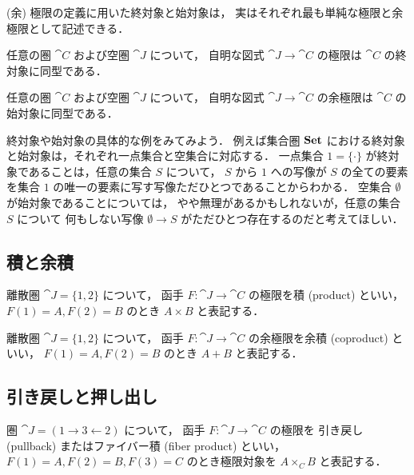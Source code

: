 \documentclass[titlepage]{ltjsreport}
\begin{document}
(余) 極限の定義に用いた終対象と始対象は，
実はそれぞれ最も単純な極限と余極限として記述できる．
\begin{theorem}[極限としての終対象]
  任意の圏 $\cat{C}$ および空圏 $\cat{J}$ について，
  自明な図式 $\cat{J}\to\cat{C}$ の極限は
  $\cat{C}$ の終対象に同型である．
\end{theorem}
\begin{theorem}[余極限としての始対象]
  任意の圏 $\cat{C}$ および空圏 $\cat{J}$ について，
  自明な図式 $\cat{J}\to\cat{C}$ の余極限は
  $\cat{C}$ の始対象に同型である．
\end{theorem}
終対象や始対象の具体的な例をみてみよう．
例えば集合圏 $\mathbf{Set}$ における終対象と始対象は，それぞれ一点集合と空集合に対応する．
一点集合 $1=\{\cdot\}$ が終対象であることは，任意の集合 $S$ について，
$S$ から $1$ への写像が $S$ の全ての要素を集合 $1$ の唯一の要素に写す写像ただひとつであることからわかる．
空集合 $\emptyset$ が始対象であることについては，
やや無理があるかもしれないが，任意の集合 $S$ について
何もしない写像 $\emptyset\to S$ がただひとつ存在するのだと考えてほしい．

\subsection{積と余積}

\begin{definition}[積]
  離散圏 $\cat{J}=\{1,2\}$ について，
  函手 $F:\cat{J}\to\cat{C}$ の極限を積 (product) といい，
  $F(1)=A,F(2)=B$ のとき $A\times B$ と表記する．
  \begin{center}
    
  \end{center}
\end{definition}

\begin{definition}[余積]
  離散圏 $\cat{J}=\{1,2\}$ について，
  函手 $F:\cat{J}\to\cat{C}$ の余極限を余積 (coproduct) といい，
  $F(1)=A,F(2)=B$ のとき $A+B$ と表記する．
  \begin{center}
    
  \end{center}
\end{definition}

\subsection{引き戻しと押し出し}

\begin{definition}[引き戻し]
  圏 $\cat{J}=(1\rightarrow3\leftarrow2)$ について，
  函手 $F:\cat{J}\to\cat{C}$ の極限を
  引き戻し (pullback) またはファイバー積 (fiber product) といい，
  $F(1)=A,F(2)=B,F(3)=C$ のとき極限対象を $A\times_CB$ と表記する．
\end{definition}
\end{document}
